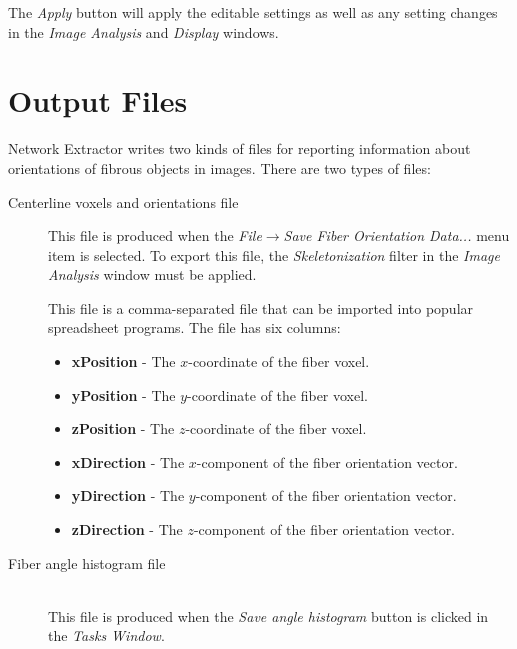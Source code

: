 \documentclass[11pt,titlepage,twoside]{article}
\begin{document}
The \emph{Apply} button will apply the editable settings as well as any setting changes in the \emph{Image Analysis} and \emph{Display} windows.

\section{Output Files}
\label{sec:CenterlineVoxelsAndOrientationsFile}

Network Extractor writes two kinds of files for reporting information about orientations of fibrous objects in images. There are two types of files:

\begin{description}

\item[Centerline voxels and orientations file]

This file is produced when the \emph{File}$\rightarrow$\emph{Save Fiber Orientation Data...}
menu item is selected. To export this file, the \emph{Skeletonization} filter in the \emph{Image Analysis} window must be applied.

This file is a comma-separated file that can be imported into popular spreadsheet programs. The file has six columns:

\begin{itemize}

  \item \textbf{xPosition}  - The $x$-coordinate of the fiber voxel.
  
  \item \textbf{yPosition} - The $y$-coordinate of the fiber voxel.
  
  \item \textbf{zPosition} - The $z$-coordinate of the fiber voxel.
  
  \item \textbf{xDirection} - The $x$-component of the fiber orientation vector.
  
  \item \textbf{yDirection} - The $y$-component of the fiber orientation vector.
  
  \item \textbf{zDirection} - The $z$-component of the fiber orientation vector.

\end{itemize}

\item[Fiber angle histogram file] \hfill \\
\label{sec:FiberAngleHistogramFileSection}
This file is produced when the \emph{Save angle histogram} button is clicked in the \emph{Tasks Window}.


\end{description}
\end{document}
